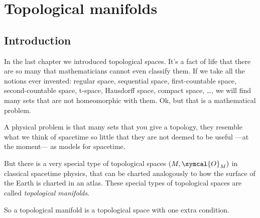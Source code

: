 %

\chapter{Topological manifolds}


\section{Introduction}
In the last chapter we introduced topological spaces. It's a fact of life that there are so many
that mathematicians cannot even classify them. If we take all the notions ever invented:
regular space, sequential space, first-countable space, second-countable space, t-space,
Hausdorff space, compact space, \dots, we will find many sets that are not homeomorphic with
them. Ok, but that is a mathematical problem.

A physical problem is that many sets that you give a topology, they resemble what we think of
spacetime so little that they are not deemed to be useful ---at the moment--- as models for
spacetime.

But there is a very special type of topological spaces $(M,\symcal{O}_M)$ in classical spacetime
physics, that can be charted analogously to how the surface of the Earth is charted in an atlas.
These special types of topological spaces are called \emph{topological manifolds}.

So a topological manifold is a topological space with one extra condition.


